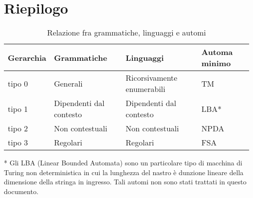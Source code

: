   \section{Riepilogo}

  \begin{table}[ht]
    \caption{Relazione fra grammatiche, linguaggi e automi}
    \centering
    \vspace{10px}
    \begin{tabular}{l l l l}
      Gerarchia & Grammatiche & Linguaggi & Automa minimo \\ 
      \hline
      tipo 0 & Generali & Ricorsivamente enumerabili & TM\\
      tipo 1 & Dipendenti dal contesto & Dipendenti dal contesto & LBA*\\
      tipo 2 & Non contestuali & Non contestuali & NPDA\\
      tipo 3 & Regolari & Regolari & FSA\\
    \end{tabular}
  \end{table}

  * Gli LBA (Linear Bounded Automata) sono un particolare tipo di macchina di Turing non deterministica in cui la lunghezza del nastro è dunzione lineare della dimensione della stringa in ingresso. Tali automi non sono stati trattati in questo documento. 
